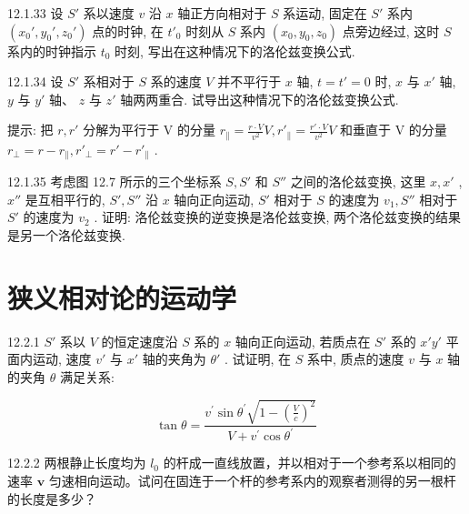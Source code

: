 \begin{problem}{12.1.33}
设 $S'$ 系以速度 $v$ 沿 $x$ 轴正方向相对于 $S$ 系运动, 固定在 $S'$ 系内 $(x_0', y_0', z_0')$ 点的时钟, 在 $t'_0$ 时刻从 $S$ 系内 $(x_0, y_0, z_0)$ 点旁边经过, 这时 $S$ 系内的时钟指示 $t_0$ 时刻, 写出在这种情况下的洛伦兹变换公式.
\end{problem}
\clearpage


\begin{problem}{12.1.34}
设 $S'$ 系相对于 $S$ 系的速度 $V$ 并不平行于 $x$ 轴, $t = t' = 0$ 时, $x$ 与 $x'$ 轴, $y$ 与 $y'$ 轴、 $z$ 与 $z'$ 轴两两重合. 试导出这种情况下的洛伦兹变换公式.

提示: 把 $r, r'$ 分解为平行于 V 的分量 $r_{\parallel} = \frac{r \cdot V}{v^{2}} V, r'_{\parallel} = \frac{r' \cdot V}{v^{2}} V$ 和垂直于 V 的分量 $r_{\perp} = r - r_{\parallel}, r'_{\perp} = r' - r'_{\parallel}$ .
\end{problem}
\clearpage


\begin{problem}{12.1.35}
考虑图 12.7 所示的三个坐标系 $S, S'$ 和 $S''$ 之间的洛伦兹变换, 这里 $x, x'$ , $x''$ 是互相平行的, $S', S''$ 沿 $x$ 轴向正向运动, $S'$ 相对于 $S$ 的速度为 $v_1, S''$ 相对于 $S'$ 的速度为 $v_2$ . 证明: 洛伦兹变换的逆变换是洛伦兹变换, 两个洛伦兹变换的结果是另一个洛伦兹变换.
\begin{center}

\end{center}
\end{problem}
\clearpage


\section{狭义相对论的运动学}

\begin{problem}{12.2.1}
$S'$ 系以 $V$ 的恒定速度沿 $S$ 系的 $x$ 轴向正向运动, 若质点在 $S'$ 系的 $x'y'$ 平面内运动, 速度 $v'$ 与 $x'$ 轴的夹角为 $\theta'$ . 试证明, 在 $S$ 系中, 质点的速度 $v$ 与 $x$ 轴的夹角 $\theta$ 满足关系:

\[
\tan \theta = \frac {v ^ {\prime} \sin \theta^ {\prime} \sqrt {1 - \left(\frac {V}{c}\right) ^ {2}}}{V + v ^ {\prime} \cos \theta^ {\prime}}
\]
\end{problem}
\clearpage


\begin{problem}{12.2.2}
两根静止长度均为 $l_{0}$ 的杆成一直线放置，并以相对于一个参考系以相同的速率 $\bm{v}$ 匀速相向运动。试问在固连于一个杆的参考系内的观察者测得的另一根杆的长度是多少？
\end{problem}
\clearpage


